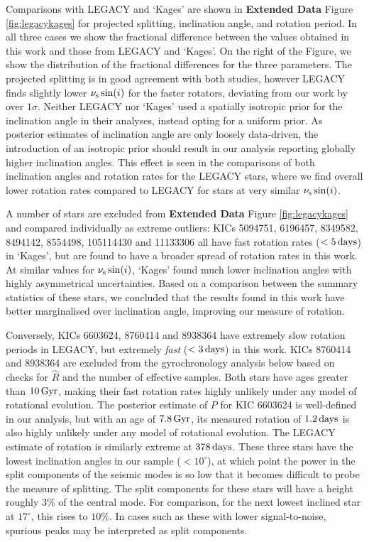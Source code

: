 Comparisons with LEGACY and `Kages' are shown in \textbf{Extended Data} Figure \ref{fig:legacykages} for projected splitting, inclination angle, and rotation period. In all three cases we show the fractional difference between the values obtained in this work and those from LEGACY and `Kages'. On the right of the Figure, we show the distribution of the fractional differences for the three parameters.
The projected splitting is in good agreement with both studies, however LEGACY finds slightly lower $\nu_{\rm s}\sin(i)$ for the faster rotators, deviating from our work by over $1\sigma$. Neither LEGACY nor `Kages' used a spatially isotropic prior for the inclination angle in their analyses, instead opting for a uniform prior. As posterior estimates of inclination angle are only loosely data-driven, the introduction of an isotropic prior should result in our analysis reporting globally higher inclination angles. This effect is seen in the comparisons of both inclination angles and rotation rates for the LEGACY stars, where we find overall lower rotation rates compared to LEGACY for stars at very similar $\nu_{\rm s}\sin(i)$.

A number of stars are excluded from \textbf{Extended Data} Figure \ref{fig:legacykages} and compared individually as extreme outliers: KICs 5094751, 6196457, 8349582, 8494142, 8554498, 105114430 and 11133306 all have fast rotation rates ($<5\, \rm days$) in `Kages', but are found to have a broader spread of rotation rates in this work. At similar values for $\nu_{\rm s}\sin(i)$, `Kages' found much lower inclination angles with highly asymmetrical uncertainties. Based on a comparison between the summary statistics of these stars, we concluded that the results found in this work have better marginalised over inclination angle, improving our measure of rotation.

Conversely, KICs 6603624, 8760414 and 8938364 have extremely slow rotation periods in LEGACY, but extremely \textit{fast} ($<3\, \rm {days}$) in this work. KICs 8760414 and 8938364 are excluded from the gyrochronology analysis below based on checks for $\hat{R}$ and the number of effective samples. Both stars have ages greater than $10\, \rm Gyr$, making their fast rotation rates highly unlikely under any model of rotational evolution. The posterior estimate of $P$ for KIC 6603624 is well-defined in our analysis, but with an age of $7.8\, \rm Gyr$, its measured rotation of $1.2\, \rm days$ is also highly unlikely under any model of rotational evolution. The LEGACY estimate of rotation is similarly extreme at $378\, \rm days$. These three stars have the lowest inclination angles in our sample ($< 10^\circ$), at which point the power in the split components of the seismic modes is so low that it becomes difficult to probe the measure of splitting. The split components for these stars will have a height roughly 3\% of the central mode. For comparison, for the next lowest inclined star at $17^\circ$, this rises to $10\%$. In cases such as these with lower signal-to-noise, spurious peaks may be interpreted as split components.\\

